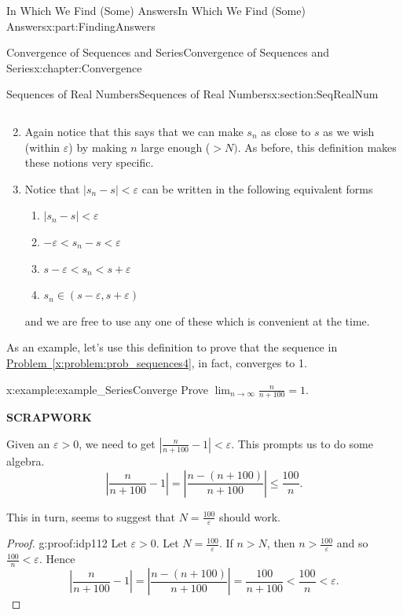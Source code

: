 \documentclass[oneside,10pt,]{book}
\newcommand{\xreffont}{\relax}
\newcommand{\terminology}[1]{\textbf{#1}}
\numberwithin{equation}{section}
\newcommand{\abs}[1]{\left|#1\right|}
\newcommand{\eps}{\varepsilon}
\newcommand{\lt}{<}
\begin{document}
\begin{partptx}{In Which We Find (Some) Answers}{}{In Which We Find (Some) Answers}{}{}{x:part:FindingAnswers}
\begin{chapterptx}{Convergence of Sequences and Series}{}{Convergence of Sequences and Series}{}{}{x:chapter:Convergence}
\begin{sectionptx}{Sequences of Real Numbers}{}{Sequences of Real Numbers}{}{}{x:section:SeqRealNum}
\begin{enumerate}
\begin{equation*}
\end{equation*}
%
\item{}Again notice that this says that we can make \(s_n\) as close to \(s\) as we wish (within \(\eps\)) by making \(n\) large enough (\(>N)\). As before, this definition makes these notions very specific.%
\item{}Notice that \(|s_n-s|\lt \eps\) can be written in the following equivalent forms%
\par
%
\begin{enumerate}
\item{}\(\displaystyle |s_n-s|\lt \eps\)%
\item{}\(\displaystyle -\eps\lt s_n-s\lt \eps\)%
\item{}\(\displaystyle s-\eps\lt s_n\lt s+\eps\)%
\item{}\(\displaystyle s_n\in\left(s-\eps,s+\eps\right)\)%
\end{enumerate}
%
\par
and we are free to use any one of these which is convenient at the time.%
\end{enumerate}
%
\par
As an example, let's use this definition to prove that the sequence in \hyperref[x:problem:prob_sequences4]{Problem~{\xreffont\ref{x:problem:prob_sequences4}}}, in fact, converges to 1.%
\begin{example}{}{x:example:example_SeriesConverge}%
Prove \(\displaystyle\lim_{n\rightarrow\infty}\frac{n}{n+100}=1\).%
\par
\terminology{SCRAPWORK}%
\par
Given an \(\eps>0\), we need to get \(\abs{\frac{n}{n+100}-1}\lt \eps\). This prompts us to do some algebra.%
\begin{equation*}
\left|\frac{n}{n+100}-1\right|=\left|\frac{n-(n+100)}{n+100}\right|\leq\frac{100}{n}\text{.}
\end{equation*}
%
\par
This in turn, seems to suggest that \(N=\frac{100}{\eps}\) should work.%
\end{example}
\begin{proof}{}{g:proof:idp112}
Let \(\eps>0\). Let \(N=\frac{100}{\eps}\). If \(n>N\), then \(n>\frac{100}{\eps}\) and so \(\frac{100}{n}\lt \eps\). Hence%
\begin{equation*}
\left|\frac{n}{n+100}-1\right|=\left|\frac{n-(n+100)}{n+100}\right|= \frac{100}{n+100}\lt \frac{100}{n}\lt \eps\text{.}
\end{equation*}
%
\par

\end{proof}
\end{sectionptx}
\end{chapterptx}
\end{partptx}
\end{document}
